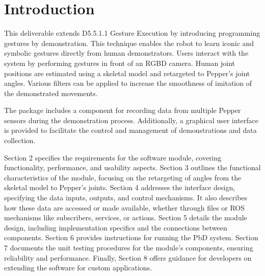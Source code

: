 \documentclass{CSSRforAfrica}
\begin{document}
\newpage
 
 
\pagebreak
\tableofcontents
\newpage


\section{Introduction}
\hspace{0.5cm}This deliverable extends D5.5.1.1 Gesture Execution by introducing programming gestures by demonstration. This technique enables the robot to learn iconic and symbolic gestures directly from human demonstrators. Users interact with the system by performing gestures in front of an RGBD camera. Human joint positions are estimated using a skeletal model and retargeted to Pepper's joint angles. Various filters can be applied to increase the smoothness of imitation of the demonstrated movements.

The package includes a component for recording data from multiple Pepper sensors during the demonstration process. Additionally, a graphical user interface is provided to facilitate the control and management of demonstrations and data collection.

Section 2 specifies the requirements for the software module, covering functionality, performance, and usability aspects. Section 3 outlines the functional characteristics of the module, focusing on the retargeting of angles from the skeletal model to Pepper's joints. Section 4 addresses the interface design, specifying the data inputs, outputs, and control mechanisms. It also describes how these data are accessed or made available, whether through files or ROS mechanisms like subscribers, services, or actions. Section 5 details the module design, including implementation specifics and the connections between components. Section 6 provides instructions for running the PbD system. Section 7 documents the unit testing procedures for the module's components, ensuring reliability and performance. Finally, Section 8 offers guidance for developers on extending the software for custom applications.
\end{document}
